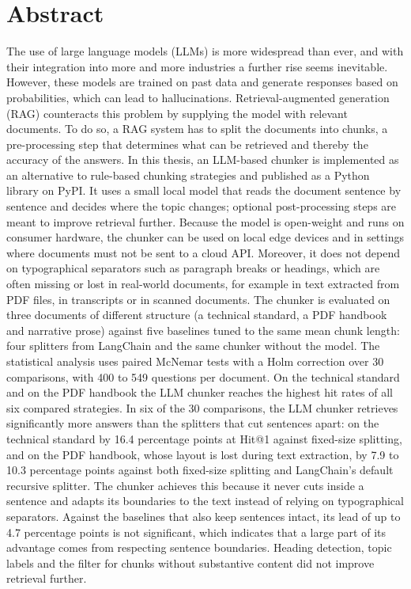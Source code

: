 \documentclass[11pt,a4paper,oneside]{report}
\makeatletter
\newcommand{\hitk}[1]{Hit@#1}
\makeatother
\begin{document}
\chapter*{Abstract}
The use of large language models (LLMs) is more widespread than ever, and with their
integration into more and more industries a further rise seems inevitable. However, these
models are trained on past data and generate responses based on probabilities, which can
lead to hallucinations. Retrieval-augmented generation (RAG) counteracts this problem by
supplying the model with relevant documents. To do so, a RAG system has to split the
documents into chunks, a pre-processing step that determines what can be retrieved and
thereby the accuracy of the answers. In this thesis, an LLM-based chunker is implemented as
an alternative to rule-based chunking strategies and published as a Python library on
PyPI. It uses a small local model that reads the document sentence by sentence and decides
where the topic changes; optional post-processing steps are meant to improve retrieval
further. Because the model is open-weight and runs on consumer hardware, the chunker can be
used on local edge devices and in settings where documents must not be sent to a cloud API.
Moreover, it does not depend on typographical separators such as paragraph breaks or
headings, which are often missing or lost in real-world documents, for example in text
extracted from PDF files, in transcripts or in scanned documents. The chunker is evaluated on three documents of different structure (a technical
standard, a PDF handbook and narrative prose) against five baselines tuned to the same mean
chunk length: four splitters from LangChain and the same chunker without the model. The
statistical analysis uses paired McNemar tests with a Holm correction over 30 comparisons,
with 400 to 549 questions per document. 
On the technical standard and on the PDF handbook the LLM chunker reaches the highest hit rates of all six compared strategies. In six of the 30 comparisons, the LLM chunker
retrieves significantly more answers than the splitters that cut sentences apart: on the technical
standard by 16.4 percentage points at \hitk{1} against fixed-size splitting, and on the PDF
handbook, whose layout is lost during text extraction, by 7.9 to 10.3 percentage points
against both fixed-size splitting and LangChain's default recursive splitter. The chunker achieves this because it never cuts inside a sentence
and adapts its boundaries to the text instead of relying on typographical separators. Against the baselines that also keep sentences intact, its lead of up to 4.7 percentage
points is not significant, which indicates that a large part of its advantage comes from
respecting sentence boundaries. Heading detection, topic labels and the filter for chunks
without substantive content did not improve retrieval further.

\tableofcontents







\printbibliography[heading=bibintoc,title={Bibliography}]
\end{document}

